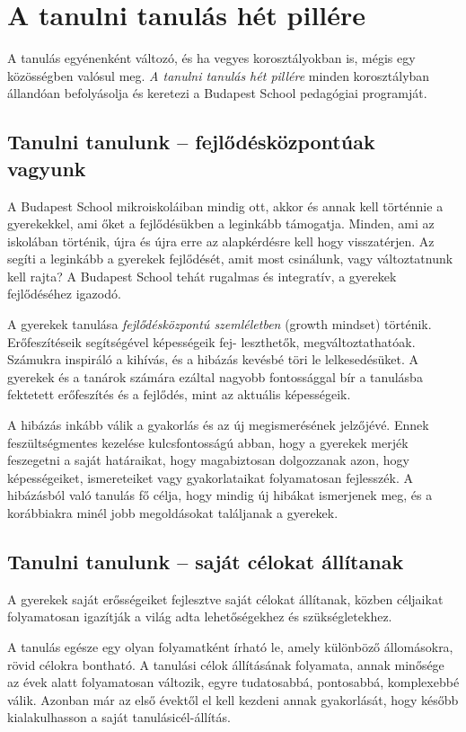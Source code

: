\section{A tanulni tanulás hét pillére}
A tanulás egyénenként változó, és ha vegyes korosztályokban is, mégis egy közösségben valósul meg. \emph{A tanulni tanulás hét pillére} minden korosztályban állandóan befolyásolja és keretezi a Budapest School pedagógiai programját.

\subsection{Tanulni tanulunk -- fejlődésközpontúak vagyunk}
A Budapest School mikroiskoláiban mindig ott, akkor és annak kell történnie a gyerekekkel, ami őket a fejlődésükben a leginkább támogatja. Minden, ami az iskolában történik, újra és újra erre az alapkérdésre kell hogy visszatérjen. Az segíti a leginkább a gyerekek fejlődését, amit most csinálunk, vagy változtatnunk kell rajta? A Budapest School tehát rugalmas és integratív, a gyerekek fejlődéséhez igazodó.

A gyerekek tanulása \emph{fejlődésközpontú szemléletben}
\citep{growthmindset}\linebreak
(growth mindset) történik.  Erőfeszítéseik segítségével képességeik
fej-\linebreak
leszthetők, megváltoztathatóak. Számukra inspiráló a kihívás, és a hibázás kevésbé töri le lelkesedésüket. A gyerekek és a tanárok számára ezáltal nagyobb fontossággal bír a tanulásba fektetett erőfeszítés és a fejlődés, mint az aktuális képességeik.

A hibázás inkább válik a gyakorlás és az új megismerésének jelzőjévé. Ennek feszültségmentes kezelése kulcsfontosságú abban, hogy a gyerekek merjék feszegetni a saját határaikat, hogy magabiztosan dolgozzanak azon, hogy képességeiket, ismereteiket vagy gyakorlataikat folyamatosan fejlesszék. A hibázásból való tanulás fő célja, hogy mindig új hibákat ismerjenek meg, és a korábbiakra minél jobb megoldásokat találjanak a gyerekek.

\subsection{Tanulni tanulunk -- saját célokat állítanak}
A gyerekek saját erősségeiket fejlesztve saját célokat állítanak, közben céljaikat folyamatosan igazítják a világ adta lehetőségekhez és szükségletekhez.

A tanulás egésze egy olyan folyamatként írható le, amely különböző állomásokra, rövid célokra bontható. A tanulási célok állításának folyamata, annak minősége az évek alatt folyamatosan változik, egyre tudatosabbá, pontosabbá, komplexebbé válik. Azonban már az első évektől el kell kezdeni annak gyakorlását, hogy később kialakulhasson a saját tanulásicél-állítás.

